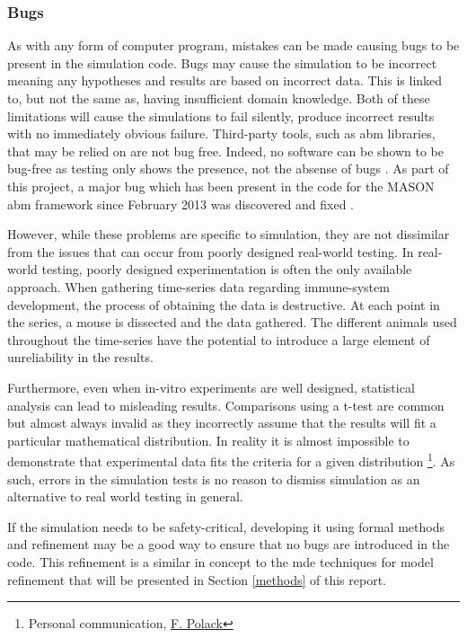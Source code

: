 \documentclass{UoYCSproject}
\begin{document}
\subsubsection{Bugs}
As with any form of computer program, mistakes can be made causing bugs to be present in the simulation code.
Bugs may cause the simulation to be incorrect meaning any hypotheses and results are based on incorrect data.
This is linked to, but not the same as, having insufficient domain knowledge.
Both of these limitations will cause the simulations to fail silently, produce incorrect results with no immediately obvious failure.
Third-party tools, such as \gls{abm} libraries, that may be relied on are not bug free.
Indeed, no software can be shown to be bug-free as testing only shows the presence, not the absense of bugs \cite[p.16]{dijkstra}.
As part of this project, a major bug which has been present in the code for the \gls{MASON} \gls{abm} framework since February 2013 was discovered and fixed \cite{mason_pull_request}.


However, while these problems are specific to simulation, they are not dissimilar from the issues that can occur from poorly designed real-world testing.
In real-world testing, poorly designed experimentation is often the only available approach.
When gathering time-series data regarding immune-system development, the process of obtaining the data is destructive.
At each point in the series, a mouse is dissected and the data gathered.
The different animals used throughout the time-series have the potential to introduce a large element of unreliability in the results.

Furthermore, even when \gls{in-vitro} experiments are well designed, statistical analysis can lead to misleading results.
Comparisons using a t-test are common but almost always invalid as they incorrectly assume that the results will fit a particular mathematical distribution.
In reality it is almost impossible to demonstrate that experimental data fits the criteria for a given distribution \footnote{Personal communication, \href{http://www.scm.keele.ac.uk/staff/f_polack/}{F. Polack}}.
As such, errors in the simulation tests is no reason to dismiss simulation as an alternative to real world testing in general.

If the simulation needs to be safety-critical, developing it using formal methods and refinement may be a good way to ensure that no bugs are introduced in the code.
This refinement is a similar in concept to the \gls{mde} techniques for model refinement that will be presented in Section \ref{methods} of this report.
\end{document}
